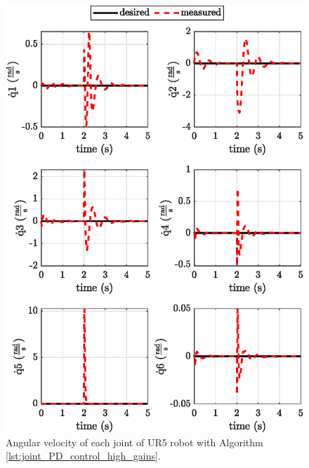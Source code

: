 \begin{figure}
    \centering
    \includegraphics{images/act_1.4/joint_velocity.eps}
    \caption{Angular velocity of each joint of UR5 robot with Algorithm \ref{lst:joint_PD_control_high_gains}.}
    \label{fig:act_1.4_joint_velocity}
\end{figure}

